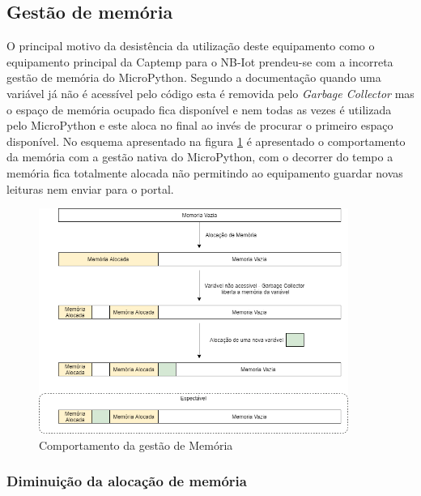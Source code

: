 \subsection {Gestão de memória}

\par O principal motivo da desistência da utilização deste equipamento como o equipamento principal da Captemp para o NB-Iot prendeu-se com a incorreta gestão de memória do MicroPython. Segundo a documentação quando uma variável já não é acessível pelo código esta é removida pelo \textit{Garbage Collector} mas o espaço de memória ocupado fica disponível e nem todas as vezes é utilizada pelo MicroPython e este aloca no final ao invés de procurar o primeiro espaço disponível. No esquema apresentado na figura \ref{memo} é apresentado o comportamento da memória com a gestão nativa do MicroPython, com o decorrer do tempo a memória fica totalmente alocada não permitindo ao equipamento guardar novas leituras nem enviar para o portal.


\begin{figure}[ht]
\centering
\includegraphics[width=0.90\textwidth]{images/memo.png}
\caption{Comportamento da gestão de Memória}\label{memo}
\end{figure}



\subsubsection {Diminuição da alocação de memória}

